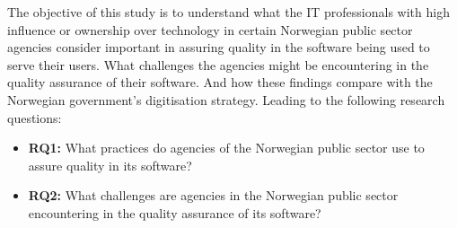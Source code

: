 



The objective of this study is to understand what the IT professionals with high influence or ownership over technology in certain Norwegian public sector agencies consider important in assuring quality in the software being used to serve their users. What challenges the agencies might be encountering in the quality assurance of their software. And how these findings compare with the Norwegian government's digitisation strategy. Leading to the following research questions:

\begin{itemize}
    \item \textbf{RQ1:} What practices do agencies of the Norwegian public sector use to assure quality in its software?
    \item \textbf{RQ2:} What challenges are agencies in the Norwegian public sector encountering in the quality assurance of its software?
\end{itemize}

